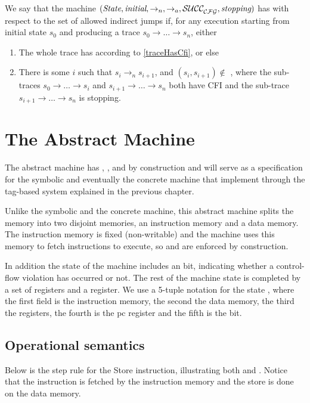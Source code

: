\begin{definition}[CFI]\label{cfi}
  We say that the machine
  $(\textit{State}, \textit{initial}, \to_n,\allowbreak \to_a, \mathcal{SUCC_\mathcal{CFG}^{}}, \textit{stopping})$
  has \CFI with respect to the set of allowed indirect jumps \CFG
  if, for any execution starting from initial state $s_0$
  and producing a trace $s_0 \to \ldots \to s_n$, either
  \begin{enumerate}
  \item The whole trace has \CFI according to
    \cref{traceHasCfi}, or else
  \item There is some $i$ such that $s_i \to_n s_{i+1}$,
  and $(s_i, s_{i+1}) \not \in$ \SUCC{}, where
  the sub-traces $s_0 \to \ldots \to s_i$ and
  $s_{i+1} \to \ldots \to s_n$ both have CFI
  and the sub-trace $s_{i+1} \to \ldots \to s_n$ is stopping.
  \end{enumerate}
\end{definition}

\section{The Abstract Machine}\label{sec:abstract_cfi}

The abstract machine has \CFI, \NXD, and \NWC by construction and will
serve as a specification for the symbolic and eventually the concrete
machine that implement \CFI through the tag-based system explained in
the previous chapter.

Unlike the symbolic and the concrete machine, this abstract machine splits the
memory into two disjoint memories, an instruction memory and a data memory. The
instruction memory is fixed (non-writable) and the machine uses this memory to
fetch instructions to execute, so \NWC and \NXD are enforced by construction.

In addition the state of the machine includes an \ok bit, indicating
whether a control-flow violation has occurred or not. The rest of the machine
state is completed by a set of registers and a \pc register. We use a 5-tuple
notation for the state \acfistat{\imem}{\dmem}{\reg}{\pc}{\ok}, where the first
field is the instruction memory, the second the data memory, the third the
registers, the fourth is the pc register and the fifth is the \ok bit.

\subsection{Operational semantics}\label{sec:abstract_semantics}
Below is the step rule for the Store instruction, illustrating both \NWC and
\NXD. Notice that the instruction is fetched by the instruction memory and
the store is done on the data memory.

